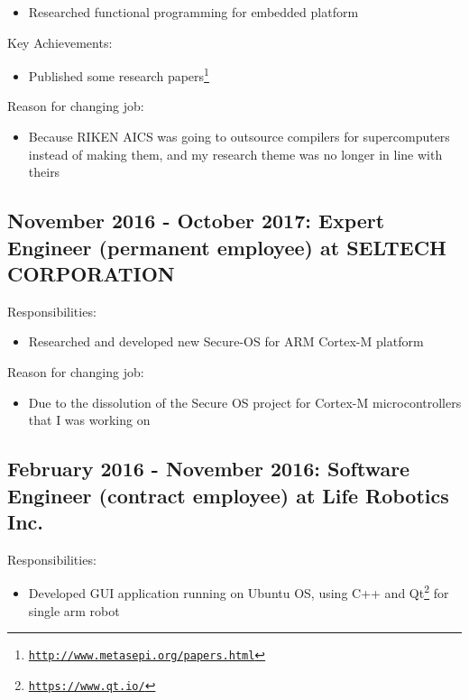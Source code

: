 \documentclass[letterpaper]{article}
\begin{document}
\begin{itemize}
  \item Researched functional programming for embedded platform
\end{itemize}

\noindent Key Achievements:

\begin{itemize}
  \item Published some research papers\footnote{\href{http://www.metasepi.org/papers.html}{\tt http://www.metasepi.org/papers.html}}
\end{itemize}

\noindent Reason for changing job:

\begin{itemize}
  \item Because RIKEN AICS was going to outsource compilers for supercomputers instead of making them, and my research theme was no longer in line with theirs
\end{itemize}

\subsection*{November 2016 - October 2017: Expert Engineer (permanent employee) at SELTECH CORPORATION}

\noindent Responsibilities:

\begin{itemize}
  \item Researched and developed new Secure-OS for ARM Cortex-M platform
\end{itemize}

\noindent Reason for changing job:

\begin{itemize}
  \item Due to the dissolution of the Secure OS project for Cortex-M microcontrollers that I was working on
\end{itemize}

\subsection*{February 2016 - November 2016: Software Engineer (contract employee) at Life Robotics Inc.}

\noindent Responsibilities:

\begin{itemize}
  \item Developed GUI application running on Ubuntu OS, using C++ and Qt\footnote{\href{https://www.qt.io/}{\tt https://www.qt.io/}} for single arm robot
\end{itemize}
\end{document}
